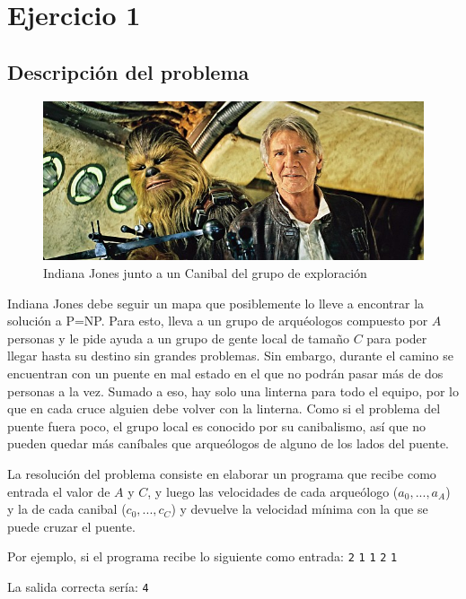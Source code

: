 \section{Ejercicio 1}
    \subsection{Descripción del problema}
		\begin{figure}[ht]
			\begin{center}
				\includegraphics[width=0.5\columnwidth]{imagenes/expedicionistas.jpg}
				\caption{Indiana Jones junto a un Canibal del grupo de exploración}
			\end{center}
		\end{figure}
        Indiana Jones debe seguir un mapa que posiblemente lo lleve a encontrar la solución a P=NP. Para esto, lleva a un grupo de arquéologos compuesto por $A$ personas y le pide ayuda a un grupo de gente local de tamaño $C$ para poder llegar hasta su destino sin grandes problemas. Sin embargo, durante el camino se encuentran con un puente en mal estado en el que no podrán pasar más de dos personas a la vez. Sumado a eso, hay solo una linterna para todo el equipo, por lo que en cada cruce alguien debe volver con la linterna. Como si el problema del puente fuera poco, el grupo local es conocido por su canibalismo, así que no pueden quedar más caníbales que arqueólogos de alguno de los lados del puente.

        La resolución del problema consiste en elaborar un programa que recibe como entrada el valor de $A$ y $C$, y luego las velocidades de cada arqueólogo ($a_0, ... , a_A$) y la de cada canibal ($c_0, ... , c_C$) y devuelve la velocidad mínima con la que se puede cruzar el puente.

        Por ejemplo, si el programa recibe lo siguiente como entrada: \newline
        \texttt{2} \texttt{1} \newline
        \texttt{1} \texttt{2} \newline
        \texttt{1}

        La salida correcta sería: \newline
        \texttt{4}

